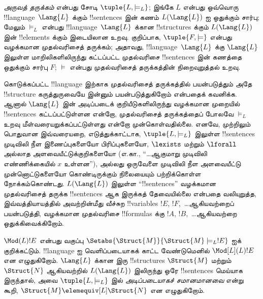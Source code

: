 \documentclass[../../../include/open-logic-section]{subfiles}
\begin{document}


\begin{defn}
\emph{அருவத் தருக்கம்} என்பது சோடி $\tuple{L, \models_L}$; இங்கே
$L$ என்பது ஒவ்வொரு !!{language}~$\Lang{L}$ க்கும் !!{sentence}s இன்
கணம் $L(\Lang{L})$ ஐ ஒதுக்கும் சார்பு; மேலும் $\models_L$ என்பது
!!{language}~$\Lang{L}$ க்கான !!{structure}s க்கும்
$L(\Lang{L})$ இன் !!{element}s க்கும் இடையிலான உறவு. குறிப்பாக,
$\tuple{F, \models}$ என்பது வழக்கமான முதல்வரிசைத் தருக்கம்; அதாவது,
!!{language}~$\Lang{L}$ க்கு $\Lang{L}$ இலுள்ள மாறிலிகளிலிருந்து
கட்டப்பட்ட முதல்வரிசை !!{sentence}s இன் கணத்தை ஒதுக்கும் சார்பு $F$;
$\models$ என்பது முதல்வரிசைத் தருக்கத்தின் நிறைவுறுத்தல் உறவு.
\end{defn}

கொடுக்கப்பட்ட !!{language} இற்காக முதல்வரிசைத் தருக்கத்தில்
பயன்படுத்தும் அதே !!{structure} கருத்துருவையே இன்னும் பயன்படுத்துகிறோம்
என்பதைக் கவனிக்க. ஆனால் $ \Lang{L}$ இன் அடிப்படைக் குறியீடுகளிலிருந்து
வழக்கமான முறையில் !!{sentence}s கட்டப்பட்டுள்ளன என்றோ, முதல்வரிசைத்
தருக்கத்தைப் போலவே $\models_L$ உறவு மீள்வரையறுக்கப்பட்டுள்ளது என்றோ
முன்கொள்வதில்லை. எனவே, முற்றிலும் பொதுவான இவ்வரையறை, எடுத்துக்காட்டாக,
$\tuple{L,\models_L}$ இலுள்ள !!{sentence}s முடிவிலி நீள இணைப்புகளையோ
பிரிப்புகளையோ, $\lexists$ மற்றும் $\lforall$ அல்லாத
அளவையீட்டுக்குறிகளையோ (எ.கா., ``\dots ஆகுமாறு முடிவிலி எண்ணிக்கையில்
$x$ உள்ளன''), அல்லது ஒருவேளை முடிவிலி நீள அளவையீட்டு முன்னொட்டுகளையோ
கொண்டிருக்கும் நிலையையும் பற்றிக்கொள்ள நோக்கம்கொண்டது.
$L(\Lang{L})$ இலுள்ள ``!!{sentence}s'' வழக்கமான முதல்வரிசைத்
தருக்க !!{sentence}s ஆக இருக்கத் தேவையில்லை என்பதை வலியுறுத்த,
இவ்வத்தியாயத்தில் அவற்றின்மீது வீச்சுற !!{variable}s $!E$,
$!F$,~\dots ஆகியவற்றைப் பயன்படுத்தி, வழக்கமான முதல்வரிசை
!!{formula}s க்கு $!A$, $!B$,~\dots ஆகியவற்றை ஒதுக்கிவைக்கிறோம்.

\begin{defn}
$\Mod(L){!E}$ என்பது வகுப்பு $\Setabs{\Struct{M}}{\Struct{M}
  \models_L !E}$ ஐக் குறிக்கட்டும். !!{language} ஐ வெளிப்படையாகக்
காட்ட வேண்டுமெனில் $\Mod[L](L){!E}$ என எழுதுகிறோம். $\Lang{L}$
க்கான இரு !!{structure}s $\Struct{M}$ மற்றும் $\Struct{N}$ ஆகியவற்றில்
$L(\Lang{L})$ இலிருந்து ஒரே !!{sentence}s மெய்யாக இருந்தால், அவை
$\tuple{L, \models_L}$ இல் \emph{அடிப்படையாகச் சமானமானவை} என்று கூறி,
$\Struct{M} \elemequiv[L] \Struct{N}$ என எழுதுகிறோம்.
\end{defn}
\end{document}
